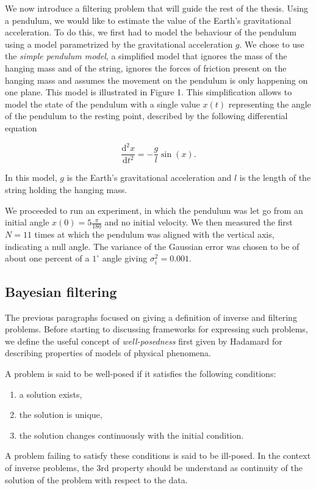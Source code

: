 We now introduce a filtering problem that will guide the rest of the thesis. Using a pendulum, we would like to estimate the value of the Earth's gravitational acceleration. To do this, we first had to model the behaviour of the pendulum using a model parametrized by the gravitational acceleration $g$. We chose to use the \textit{simple pendulum model}, a simplified model that ignores the mass of the hanging mass and of the string, ignores the forces of friction present on the hanging mass and assumes the movement on the pendulum is only happening on one plane. This model is illustrated in Figure 1. This simplification allows to model the state of the pendulum with a single value $x(t)$ representing the angle of the pendulum to the resting point, described by the following differential equation

\begin{equation}
  \frac{\text{d}^2x}{\text{d}t^2} = -\frac{g}{l}\sin(x).
\end{equation}

In this model, $g$ is the Earth's gravitational acceleration and $l$ is the length of the string holding the hanging mass.

We proceeded to run an experiment, in which the pendulum was let go from an initial angle $x(0) = 5\frac{\pi}{180}$ and no initial velocity. We then measured the first $N = 11$ times at which the pendulum was aligned with the vertical axis, indicating a null angle. The variance of the Gaussian error was chosen to be of about one percent of a $1^\circ$ angle giving $\sigma_i^2 = 0.001$.

\subsection{Bayesian filtering}

The previous paragraphs focused on giving a definition of inverse and filtering problems. Before starting to discussing frameworks for expressing such problems, we define the useful concept of \textit{well-posedness} first given by Hadamard for describing properties of models of physical phenomena.

\begin{definition} A problem is said to be well-posed if it satisfies the following conditions:
  \begin{enumerate}
  \item{a solution exists,}
  \item{the solution is unique,}
  \item{the solution changes continuously with the initial condition.}
  \end{enumerate}

  A problem failing to satisfy these conditions is said to be ill-posed. In the context of inverse problems, the 3rd property should be understand as continuity of the solution of the problem with respect to the data.  
\end{definition}

